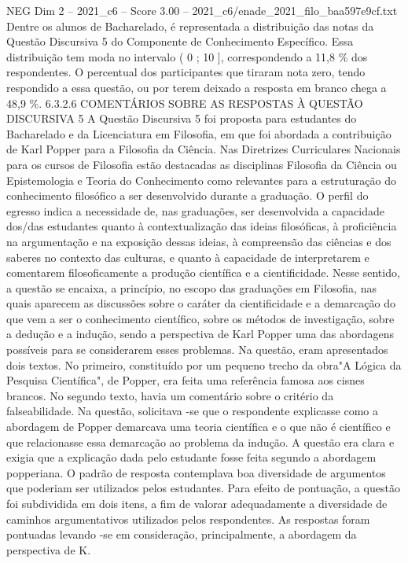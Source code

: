 \begin{textsample}{NEG Dim 2 – 2021\_c6 – Score 3.00 – 2021\_c6/enade\_2021\_filo\_baa597e9cf.txt}
Dentre os alunos de Bacharelado, é representada a distribuição das notas da Questão Discursiva 5 do Componente de Conhecimento Específico.
Essa distribuição tem moda no intervalo ( 0 ; 10 ], correspondendo a 11,8 \% dos respondentes.
O percentual dos participantes que tiraram nota zero, tendo respondido a essa questão, ou por terem deixado a resposta em branco chega a 48,9 \%. 6.3.2.6 COMENTÁRIOS SOBRE AS RESPOSTAS À QUESTÃO DISCURSIVA 5 A Questão Discursiva 5 foi proposta para estudantes do Bacharelado e da Licenciatura em Filosofia, em que foi abordada a contribuição de Karl Popper para a Filosofia da Ciência.
Nas Diretrizes Curriculares Nacionais para os cursos de Filosofia estão destacadas as disciplinas Filosofia da Ciência ou Epistemologia e Teoria do Conhecimento como relevantes para a estruturação do conhecimento filosófico a ser desenvolvido durante a graduação.
O perfil do egresso indica a necessidade de, nas graduações, ser desenvolvida a capacidade dos/das estudantes quanto à contextualização das ideias filosóficas, à proficiência na argumentação e na exposição dessas ideias, à compreensão das ciências e dos saberes no contexto das culturas, e quanto à capacidade de interpretarem e comentarem filosoficamente a produção científica e a cientificidade.
Nesse sentido, a questão se encaixa, a princípio, no escopo das graduações em Filosofia, nas quais aparecem as discussões sobre o caráter da cientificidade e a demarcação do que vem a ser o conhecimento científico, sobre os métodos de investigação, sobre a dedução e a indução, sendo a perspectiva de Karl Popper uma das abordagens possíveis para se considerarem esses problemas.
Na questão, eram apresentados dois textos.
No primeiro, constituído por um pequeno trecho da obra"A Lógica da Pesquisa Científica", de Popper, era feita uma referência famosa aos cisnes brancos.
No segundo texto, havia um comentário sobre o critério da falseabilidade.
Na questão, solicitava -se que o respondente explicasse como a abordagem de Popper demarcava uma teoria científica e o que não é científico e que relacionasse essa demarcação ao problema da indução.
A questão era clara e exigia que a explicação dada pelo estudante fosse feita segundo a abordagem popperiana.
O padrão de resposta contemplava boa diversidade de argumentos que poderiam ser utilizados pelos estudantes.
Para efeito de pontuação, a questão foi subdividida em dois itens, a fim de valorar adequadamente a diversidade de caminhos argumentativos utilizados pelos respondentes.
As respostas foram pontuadas levando -se em consideração, principalmente, a abordagem da perspectiva de K.

\end{textsample}
